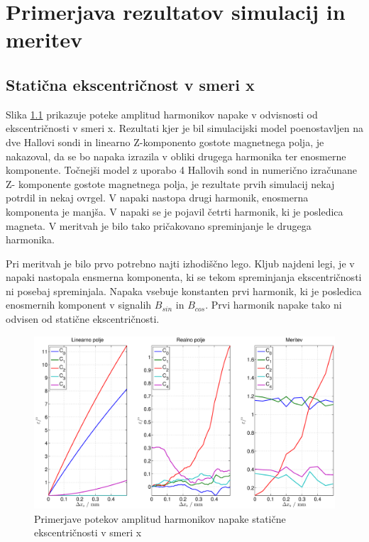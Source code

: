 \chapter{Primerjava rezultatov simulacij in meritev}
\section{Statična ekscentričnost v smeri x}
Slika \ref{primerjava_xs} prikazuje poteke amplitud harmonikov napake v odvisnosti od ekscentričnosti v smeri x. 
Rezultati kjer je bil simulacijski model poenostavljen na dve Hallovi sondi in linearno Z-komponento gostote magnetnega polja, je nakazoval, da se bo napaka izrazila v obliki drugega harmonika ter enosmerne komponente.
Točnejši model z uporabo 4 Hallovih sond in numerično izračunane Z- komponente gostote magnetnega polja, je rezultate prvih simulacij nekaj potrdil in nekaj ovrgel. V napaki nastopa drugi harmonik, enosmerna komponenta je manjša. V napaki se je pojavil četrti harmonik, ki je posledica magneta. V meritvah je bilo tako pričakovano spreminjanje le drugega harmonika.

Pri meritvah je bilo prvo potrebno najti izhodiščno  lego. Kljub najdeni legi, je v napaki nastopala ensmerna komponenta, ki se tekom spreminjanja ekscentričnosti ni posebaj spreminjala. Napaka vsebuje konstanten prvi harmonik, ki je posledica enosmernih komponent v signalih $B_{sin}$ in $B_{cos}$. Prvi harmonik napake tako ni odvisen od statične ekscentričnosti.
\begin{figure}[ht]
	\centering
	\includegraphics[width=\columnwidth]{./Slike/primerjava_xs.eps}
	\caption{Primerjave potekov amplitud harmonikov napake  statične ekscentričnosti v smeri x}
	\label{primerjava_xs}
\end{figure}
